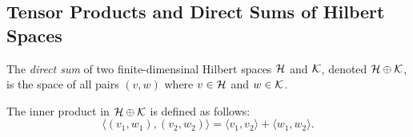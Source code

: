 \subsection {Tensor Products and Direct Sums of Hilbert Spaces}

\begin{definition}
  The \emph{direct sum} of two finite-dimensinal Hilbert spaces $\mathcal{H}$ and $\mathcal{K}$, denoted $\mathcal{H} \oplus \mathcal{K}$, is the space of all pairs $(v, w)$ where $v \in \mathcal{H}$ and $w \in \mathcal{K}$.
\end{definition}

The inner product in $\mathcal{H} \oplus \mathcal{K}$ is defined as follows:
\begin{equation*}
  \langle (v_1, w_1), (v_2, w_2) \rangle = \langle v_1, v_2 \rangle + \langle w_1, w_2 \rangle.
\end{equation*}



